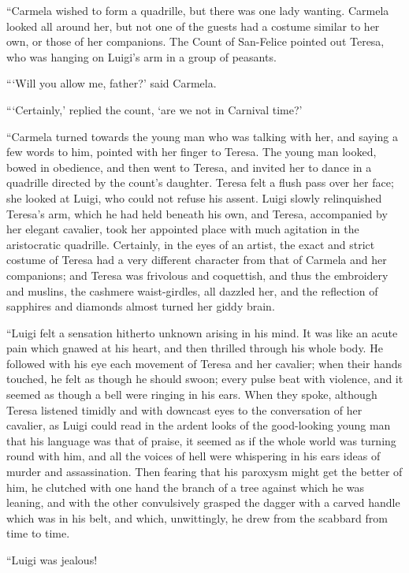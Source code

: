 “Carmela wished to form a quadrille, but there was one lady wanting.
Carmela looked all around her, but not one of the guests had a costume
similar to her own, or those of her companions. The Count of San-Felice
pointed out Teresa, who was hanging on Luigi’s arm in a group of
peasants.

“‘Will you allow me, father?’ said Carmela.

“‘Certainly,’ replied the count, ‘are we not in Carnival time?’

“Carmela turned towards the young man who was talking with her, and
saying a few words to him, pointed with her finger to Teresa. The young
man looked, bowed in obedience, and then went to Teresa, and invited
her to dance in a quadrille directed by the count’s daughter. Teresa
felt a flush pass over her face; she looked at Luigi, who could not
refuse his assent. Luigi slowly relinquished Teresa’s arm, which he had
held beneath his own, and Teresa, accompanied by her elegant cavalier,
took her appointed place with much agitation in the aristocratic
quadrille. Certainly, in the eyes of an artist, the exact and strict
costume of Teresa had a very different character from that of Carmela
and her companions; and Teresa was frivolous and coquettish, and thus
the embroidery and muslins, the cashmere waist-girdles, all dazzled
her, and the reflection of sapphires and diamonds almost turned her
giddy brain.

“Luigi felt a sensation hitherto unknown arising in his mind. It was
like an acute pain which gnawed at his heart, and then thrilled through
his whole body. He followed with his eye each movement of Teresa and
her cavalier; when their hands touched, he felt as though he should
swoon; every pulse beat with violence, and it seemed as though a bell
were ringing in his ears. When they spoke, although Teresa listened
timidly and with downcast eyes to the conversation of her cavalier, as
Luigi could read in the ardent looks of the good-looking young man that
his language was that of praise, it seemed as if the whole world was
turning round with him, and all the voices of hell were whispering in
his ears ideas of murder and assassination. Then fearing that his
paroxysm might get the better of him, he clutched with one hand the
branch of a tree against which he was leaning, and with the other
convulsively grasped the dagger with a carved handle which was in his
belt, and which, unwittingly, he drew from the scabbard from time to
time.

“Luigi was jealous!

